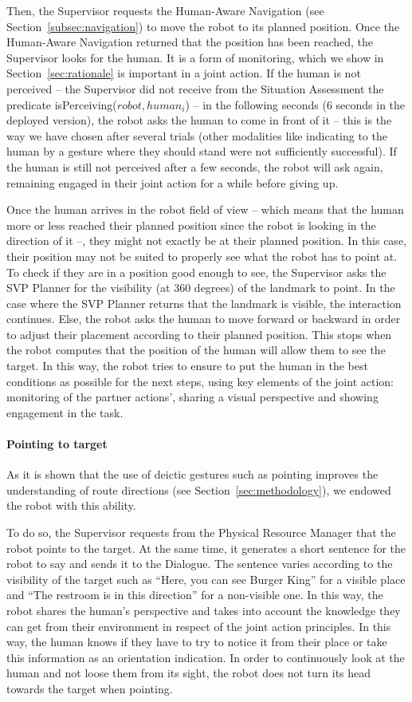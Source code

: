 \documentclass[a4paper,11pt,twoside]{StyleThese}
\begin{document}
Then, the Supervisor requests the Human-Aware Navigation (see Section~\ref{subsec:navigation})  to move the robot to its planned position. Once the Human-Aware Navigation returned that the position has been reached, the Supervisor looks for the human. It is a form of monitoring, which we show in Section~\ref{sec:rationale} is important in a joint action. If the human is not perceived -- the Supervisor did not receive from the Situation Assessment the predicate isPerceiving(\(robot, human_i\)) -- in the following seconds (6 seconds in the deployed version), the robot asks the human to come in front of it -- this is the way we have chosen after several trials (other modalities like indicating to the human by a gesture where they should stand were not sufficiently successful). If the human is still not perceived after a few seconds, the robot will ask again, remaining engaged in their joint action for a while before giving up.

Once the human arrives in the robot field of view -- which means that the human more or less reached their planned position since the robot is looking in the direction of it --, they might not exactly be at their planned position. In this case, their position may not be suited to properly see what the robot has to point at. To check if they are in a position good enough to see, the Supervisor asks the SVP Planner for the visibility (at 360 degrees) of the landmark to point. In the case where the SVP Planner returns that the landmark is visible, the interaction continues. Else, the robot asks the human to move forward or backward in order to adjust their placement according to their planned position. This stops when the robot computes that the position of the human will allow them to see the target. In this way, the robot tries to ensure to put the human in the best conditions as possible for the next steps, using key elements of the joint action: monitoring of the partner actions', sharing a visual perspective and showing engagement in the task.

\paragraph{Pointing to target}
As it is shown that the use of deictic gestures such as pointing improves the understanding of route directions (see Section~\ref{sec:methodology}), we endowed the robot with this ability. 

To do so, the Supervisor requests from the Physical Resource Manager that the robot points to the target. At the same time, it generates a short sentence for the robot to say and sends it to the Dialogue. The sentence varies according to the visibility of the target such as ``Here, you can see Burger King'' for a visible place and ``The restroom is in this direction'' for a non-visible one. In this way, the robot shares the human's perspective and takes into account the knowledge they can get from their environment in respect of the joint action principles. In this way, the human knows if they have to try to notice it from their place or take this information as an orientation indication. In order to continuously look at the human and not loose them from its sight, the robot does not turn its head towards the target when pointing.
\end{document}
